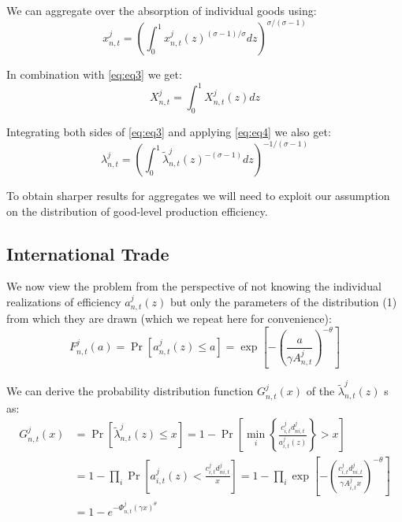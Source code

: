 \documentclass[12pt, bibtotoc, tablecaptionabove, figurecaptionabove, fleqn]{article}
\begin{document}
We can aggregate over the absorption of individual goods using:
\begin{equation*}
x_{n, t}^{j}=\left(\int_{0}^{1} x_{n, t}^{j}(z)^{(\sigma-1) / \sigma} d z\right)^{\sigma /(\sigma-1)}
\end{equation*}

In combination with \ref{eq:eq3} we get: 
\begin{equation}\label{eq:eq4}
X_{n, t}^{j}=\int_{0}^{1} X_{n, t}^{j}(z) d z
\end{equation}

Integrating both sides of \ref{eq:eq3} and applying \ref{eq:eq4} we also get:
\begin{equation*}
\lambda_{n, t}^{j}=\left(\int_{0}^{1} \tilde{\lambda}_{n, t}^{j}(z)^{-(\sigma-1)} d z\right)^{-1 /(\sigma-1)}
\end{equation*}

To obtain sharper results for aggregates we will need to exploit our assumption on the distribution of good-level production efficiency.


\subsection{International Trade}
We now view the problem from the perspective of not knowing the individual realizations of efficiency $a_{n, t}^{j}(z)$ but only the parameters of the distribution (1) from which they are drawn (which we repeat here for convenience):
\begin{equation*}
F_{n, t}^{j}(a)=\operatorname{Pr}\left[a_{n, t}^{j}(z) \leq a\right]=\exp \left[-\left(\frac{a}{\gamma A_{n, t}^{j}}\right)^{-\theta}\right]
\end{equation*}

We can derive the probability distribution function $G_{n, t}^{j}(x)$ of the $\tilde{\lambda}_{n, t}^{j}(z)$ s as:
\begin{equation*}
	\begin{aligned}
G_{n, t}^{j}(x) &=\operatorname{Pr}\left[\tilde{\lambda}_{n, t}^{j}(z) \leq x\right]=1-\operatorname{Pr}\left[\min _{i}\left\{\frac{c_{i, t}^{j} d_{n i, t}^{j}}{a_{i, t}^{j}(z)}\right\}>x\right] \\
&=1-\prod_{i} \operatorname{Pr}\left[a_{i, t}^{j}(z)<\frac{c_{i, t}^{j} d_{n i, t}^{j}}{x}\right]=1-\prod_{i} \exp \left[-\left(\frac{c_{i, t}^{j} d_{n i, t}^{j}}{\gamma A_{i, t}^{j} x}\right)^{-\theta}\right] \\
&=1-e^{-\Phi_{n, t}^{j}(\gamma x)^{\theta}}
\end{aligned}
\end{equation*}
\end{document}
